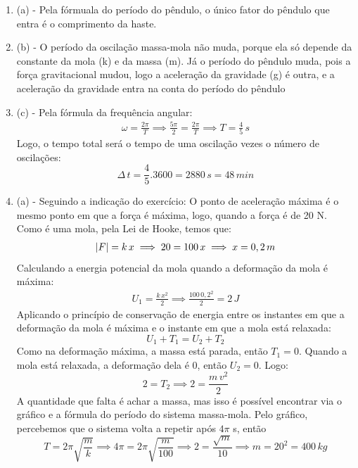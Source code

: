 \documentclass[12pt,letterpaper,fleqn]{article}
\begin{document}
\begin{enumerate}
    \item (a) - Pela fórmuala do período do pêndulo, o único fator do pêndulo que entra é o comprimento da haste.
    \item (b) - O período da oscilação massa-mola não muda, porque ela só depende da constante da mola (k) e da massa (m). Já o período do pêndulo muda, pois a força gravitacional mudou, logo a aceleração da gravidade (g) é outra, e a aceleração da gravidade entra na conta do período do pêndulo
    \item (c) - Pela fórmula da frequência angular:
    \begin{align*}
        \omega = \frac{2\pi}{T} \implies \frac{5\pi}{2} = \frac{2\pi}{T} \implies T = \frac{4}{5}\,s
    \end{align*}
    Logo, o tempo total será o tempo de uma oscilação vezes o número de oscilações:
    \begin{equation*}
        \Delta\,t = \frac{4}{5}.3600 = 2880\,s = 48\,min
    \end{equation*}
    \item (a) - Seguindo a indicação do exercício: O ponto de aceleração máxima é o mesmo ponto em que a força é máxima, logo, quando a força é de 20 N. Como é uma mola, pela Lei de Hooke, temos que:
    \begin{align*}
        \abs{F} = k\,x \implies 20 = 100\,x \implies x = 0,2\,m
    \end{align*}
    Calculando a energia potencial da mola quando a deformação da mola é máxima:
    \begin{align*}
        U_1 = \frac{k\,x^2}{2} \implies \frac{100\,0,2^2}{2} = 2\,J
    \end{align*}
    Aplicando o princípio de conservação de energia entre os instantes em que a deformação da mola é máxima e o instante em que a mola está relaxada:
    \begin{equation*}
        U_{1} + T_1 = U_2 + T_2
    \end{equation*}
    Como na deformação máxima, a massa está parada, então $T_1=0$. Quando a mola está relaxada, a deformação dela é 0, então $U_2 = 0$. Logo:
    \begin{equation*}
        2 = T_2 \implies 2 = \frac{m\,v^2}{2}
    \end{equation*}
    A quantidade que falta é achar a massa, mas isso é possível encontrar via o gráfico e a fórmula do período do sistema massa-mola. Pelo gráfico, percebemos que o sistema volta a repetir após $4\pi$ s, então
    \begin{equation*}
        T = 2\pi\sqrt{\frac{m}{k}} \implies 4\pi = 2\pi\sqrt{\frac{m}{100}} \implies 2 = \frac{\sqrt{m}}{10} \implies m = 20^2 = 400\,kg
    \end{equation*}
    

\end{enumerate}
\end{document}
